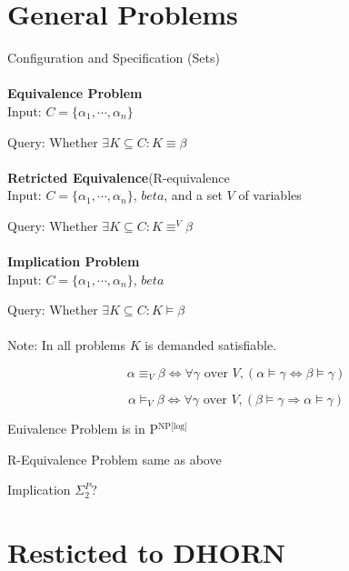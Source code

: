 \documentclass[12pt]{article}
\begin{document}
\section{General Problems}


Configuration and Specification (Sets)\\ \ \\

{\bf Equivalence Problem}\\

Input: $C=\{\alpha_1,\cdots,\alpha_n\}$

Query: Whether $\exists K\subseteq C: K\equiv \beta$\\


\ \\

{\bf Retricted Equivalence}(R-equivalence\\

Input: $C=\{\alpha_1,\cdots,\alpha_n\}$, $beta$, and a set $V$ of variables

Query: Whether $\exists K\subseteq C: K\equiv^V \beta$\\ 

\ \ \\

{\bf Implication Problem}\\

Input: $C=\{\alpha_1,\cdots,\alpha_n\}$, $beta$

Query: Whether $\exists K\subseteq C: K\models \beta$\\ 


\ \\ 

Note: In all problems $K$ is demanded satisfiable.

$$\alpha \equiv_V \beta \Longleftrightarrow \forall \gamma \mbox{ over } V, (\alpha\models \gamma \Leftrightarrow \beta\models \gamma) $$

$$\alpha \models_V \beta \Longleftrightarrow \forall \gamma \mbox{ over } V, (\beta\models \gamma \Longrightarrow \alpha\models \gamma) $$



Euivalence Problem is in P$^{\mbox{NP[log]}}$

R-Equivalence Problem same as above

Implication  $\Sigma_2^P$?







\section{Resticted to DHORN}
\end{document}
